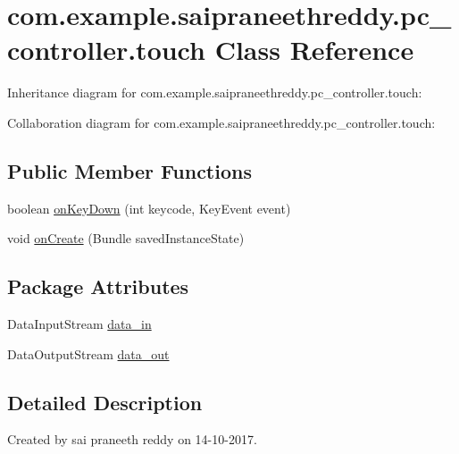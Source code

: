 \hypertarget{classcom_1_1example_1_1saipraneethreddy_1_1pc__controller_1_1touch}{}\section{com.\+example.\+saipraneethreddy.\+pc\+\_\+controller.\+touch Class Reference}
\label{classcom_1_1example_1_1saipraneethreddy_1_1pc__controller_1_1touch}


Inheritance diagram for com.\+example.\+saipraneethreddy.\+pc\+\_\+controller.\+touch\+:


Collaboration diagram for com.\+example.\+saipraneethreddy.\+pc\+\_\+controller.\+touch\+:
\subsection*{Public Member Functions}
\begin{DoxyCompactItemize}
\item 
boolean \hyperlink{classcom_1_1example_1_1saipraneethreddy_1_1pc__controller_1_1touch_a215975f62fcdd83c04c276cb116a7e9a}{on\+Key\+Down} (int keycode, Key\+Event event)
\item 
void \hyperlink{classcom_1_1example_1_1saipraneethreddy_1_1pc__controller_1_1touch_aaca0fee1bfcba8353c8e438ee26099f2}{on\+Create} (Bundle saved\+Instance\+State)
\end{DoxyCompactItemize}
\subsection*{Package Attributes}
\begin{DoxyCompactItemize}
\item 
Data\+Input\+Stream \hyperlink{classcom_1_1example_1_1saipraneethreddy_1_1pc__controller_1_1touch_ab35bae7e144222b53568d62f1aec74f8}{data\+\_\+in}
\item 
Data\+Output\+Stream \hyperlink{classcom_1_1example_1_1saipraneethreddy_1_1pc__controller_1_1touch_ac871e92eec06ef34db2847f7cb0c0cad}{data\+\_\+out}
\end{DoxyCompactItemize}


\subsection{Detailed Description}
Created by sai praneeth reddy on 14-\/10-\/2017. 


